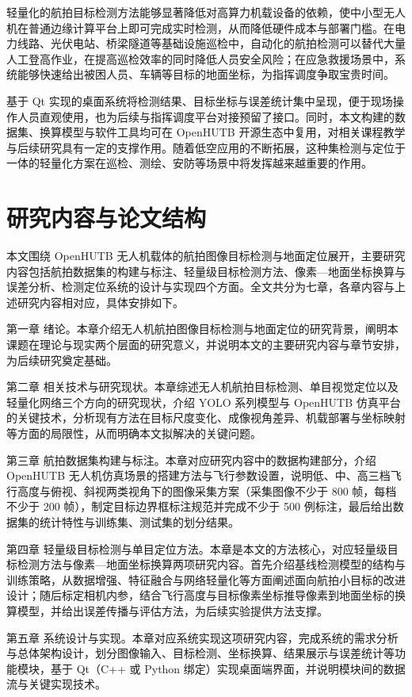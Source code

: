 轻量化的航拍目标检测方法能够显著降低对高算力机载设备的依赖，使中小型无人机在普通边缘计算平台上即可完成实时检测，从而降低硬件成本与部署门槛。在电力线路、光伏电站、桥梁隧道等基础设施巡检中，自动化的航拍检测可以替代大量人工登高作业，在提高巡检效率的同时降低人员安全风险；在应急救援场景中，系统能够快速给出被困人员、车辆等目标的地面坐标，为指挥调度争取宝贵时间。

基于 Qt 实现的桌面系统将检测结果、目标坐标与误差统计集中呈现，便于现场操作人员直观使用，也为后续与指挥调度平台对接预留了接口。同时，本文构建的数据集、换算模型与软件工具均可在 OpenHUTB 开源生态中复用，对相关课程教学与后续研究具有一定的支撑作用。随着低空应用的不断拓展，这种集检测与定位于一体的轻量化方案在巡检、测绘、安防等场景中将发挥越来越重要的作用。

\section{研究内容与论文结构}

本文围绕 OpenHUTB 无人机载体的航拍图像目标检测与地面定位展开，主要研究内容包括航拍数据集的构建与标注、轻量级目标检测方法、像素—地面坐标换算与误差分析、检测定位系统的设计与实现四个方面。全文共分为七章，各章内容与上述研究内容相对应，具体安排如下。

第一章 绪论。本章介绍无人机航拍图像目标检测与地面定位的研究背景，阐明本课题在理论与现实两个层面的研究意义，并说明本文的主要研究内容与章节安排，为后续研究奠定基础。

第二章 相关技术与研究现状。本章综述无人机航拍目标检测、单目视觉定位以及轻量化网络三个方向的研究现状，介绍 YOLO 系列模型与 OpenHUTB 仿真平台的关键技术，分析现有方法在目标尺度变化、成像视角差异、机载部署与坐标映射等方面的局限性，从而明确本文拟解决的关键问题。

第三章 航拍数据集构建与标注。本章对应研究内容中的数据构建部分，介绍 OpenHUTB 无人机仿真场景的搭建方法与飞行参数设置，说明低、中、高三档飞行高度与俯视、斜视两类视角下的图像采集方案（采集图像不少于 800 帧，每档不少于 200 帧），制定目标边界框标注规范并完成不少于 500 例标注，最后给出数据集的统计特性与训练集、测试集的划分结果。

第四章 轻量级目标检测与单目定位方法。本章是本文的方法核心，对应轻量级目标检测方法与像素—地面坐标换算两项研究内容。首先介绍基线检测模型的结构与训练策略，从数据增强、特征融合与网络轻量化等方面阐述面向航拍小目标的改进设计；随后标定相机内参，结合飞行高度与目标像素坐标推导像素到地面坐标的换算模型，并给出误差传播与评估方法，为后续实验提供方法支撑。

第五章 系统设计与实现。本章对应系统实现这项研究内容，完成系统的需求分析与总体架构设计，划分图像输入、目标检测、坐标换算、结果展示与误差统计等功能模块，基于 Qt（C++ 或 Python 绑定）实现桌面端界面，并说明模块间的数据流与关键实现技术。

